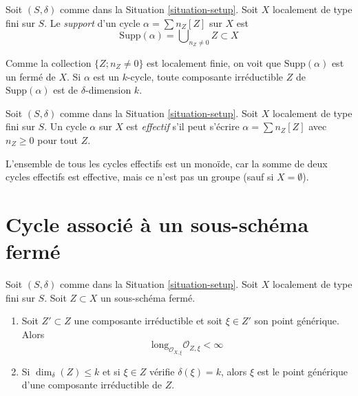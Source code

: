 \begin{definition}
\label{definition-support-cycle}
Soit $(S, \delta)$ comme dans la Situation \ref{situation-setup}.
Soit $X$ localement de type fini sur $S$.
Le {\it support} d'un cycle $\alpha = \sum n_Z [Z]$ sur $X$
est
$$
\text{Supp}(\alpha) = \bigcup\nolimits_{n_Z \not = 0} Z \subset X
$$
\end{definition}

\noindent
Comme la collection $\{Z; n_Z \not = 0\}$ est localement finie,
on voit que $\text{Supp}(\alpha)$ est un fermé de $X$.
Si $\alpha$ est un $k$-cycle, toute composante irréductible $Z$
de $\text{Supp}(\alpha)$ est de $\delta$-dimension $k$.

\begin{definition}
\label{definition-effective-cycle}
Soit $(S, \delta)$ comme dans la Situation \ref{situation-setup}.
Soit $X$ localement de type fini sur $S$.
Un cycle $\alpha$ sur $X$ est {\it effectif} s'il
peut s'écrire $\alpha =\sum n_Z [Z]$ avec $n_Z \geq 0$ pour tout $Z$.
\end{definition}

\noindent
L'ensemble de tous les cycles effectifs est un monoïde, car la somme de
deux cycles effectifs est effective, mais ce n'est pas un groupe
(sauf si $X = \emptyset$).




\section{Cycle associé à un sous-schéma fermé}
\label{section-cycle-of-closed-subscheme}

\begin{lemma}
\label{lemma-multiplicity-finite}
Soit $(S, \delta)$ comme dans la Situation \ref{situation-setup}.
Soit $X$ localement de type fini sur $S$.
Soit $Z \subset X$ un sous-schéma fermé.
\begin{enumerate}
\item Soit $Z' \subset Z$ une composante irréductible et
soit $\xi \in Z'$ son point générique.
Alors
$$
\text{long}_{\mathcal{O}_{X, \xi}} \mathcal{O}_{Z, \xi} < \infty
$$
\item Si $\dim_\delta(Z) \leq k$ et si $\xi \in Z$ vérifie
$\delta(\xi) = k$, alors $\xi$ est le point générique d'une
composante irréductible de $Z$.
\end{enumerate}
\end{lemma}

